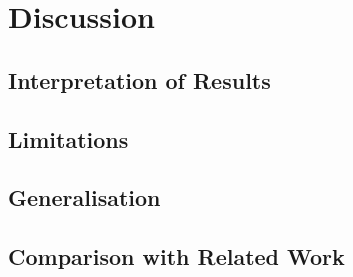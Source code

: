 \chapter{Discussion}


\section{Interpretation of Results}




\section{Limitations}




\section{Generalisation}




\section{Comparison with Related Work}






